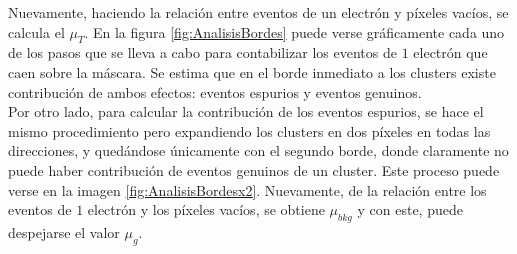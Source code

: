 Nuevamente, haciendo la relación entre eventos de un electrón y píxeles vacíos, se calcula el $\mu_{T}$. En la figura \ref{fig:AnalisisBordes} puede verse gráficamente cada uno de los pasos que se lleva a cabo para contabilizar los eventos de $1$ electrón que caen sobre la máscara. Se estima que en el borde inmediato a los clusters existe contribución de ambos efectos: eventos espurios y eventos genuinos.\\
\indent Por otro lado, para calcular la contribución de los eventos espurios, se hace el mismo procedimiento pero expandiendo los clusters en dos píxeles en todas las direcciones, y quedándose únicamente con el segundo borde, donde claramente no puede haber contribución de eventos genuinos de un cluster. Este proceso puede verse en la imagen \ref{fig:AnalisisBordesx2}. Nuevamente, de la relación entre los eventos de $1$ electrón y los píxeles vacíos, se obtiene $\mu_{bkg}$ y con este, puede despejarse el valor $\mu_{g}$.\\

